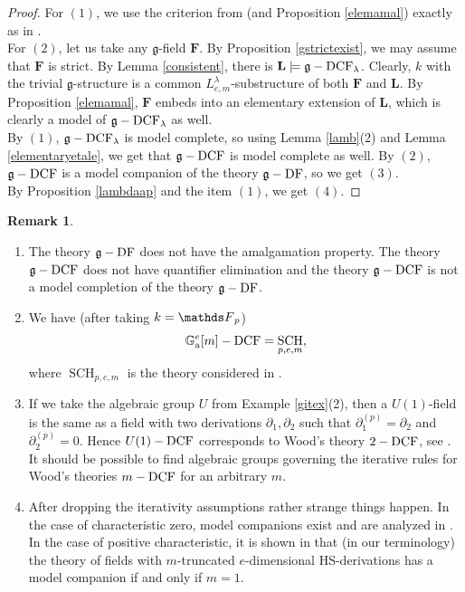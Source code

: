 \documentclass[10pt]{amsart}
\DeclareMathOperator{\sch}{SCH}\DeclareMathOperator{\strict}{strict}\DeclareMathOperator{\der}{Der}\DeclareMathOperator{\acf}{ACF}
\theoremstyle{definition}
\newtheorem{remark}[theorem]{Remark}
\begin{document}
\begin{proof}
For $(1)$, we use the criterion from \cite[Theorem 13.1]{sacks} (and Proposition \ref{elemamal}) exactly as in \cite[3.1]{Zieg2}.
\\
For $(2)$, let us take any $\mathfrak{g}$-field $\mathbf{F}$. By Proposition \ref{gstrictexist}, we may assume that $\mathbf{F}$ is strict. By Lemma \ref{consistent}, there is $\mathbf{L}\models \mathfrak{g}-\operatorname{DCF}_{\lambda}$. Clearly, $k$ with the trivial $\mathfrak{g}$-structure is a common $L^{\lambda}_{e,m}$-substructure of both $\mathbf{F}$ and $\mathbf{L}$. By Proposition \ref{elemamal}, $\mathbf{F}$ embeds into an elementary extension of $\mathbf{L}$, which is clearly a model of  $\mathfrak{g}-\operatorname{DCF}_{\lambda}$ as well.
\\
By $(1)$, $\mathfrak{g}-\operatorname{DCF}_{\lambda}$ is model complete, so using Lemma \ref{lamb}(2) and Lemma \ref{elementaryetale}, we get that $\mathfrak{g}-\operatorname{DCF}$ is model complete as well. By $(2)$, $\mathfrak{g}-\operatorname{DCF}$ is a model companion of the theory $\mathfrak{g}-\operatorname{DF}$, so we get $(3)$.
\\
By Proposition \ref{lambdaap} and the item $(1)$, we get $(4)$.
\end{proof}
\begin{remark}
\begin{enumerate}
\item The theory $\mathfrak{g}-\operatorname{DF}$ does not have the amalgamation property. The theory $\mathfrak{g}-\operatorname{DCF}$ does not have quantifier elimination and the theory $\mathfrak{g}-\operatorname{DCF}$ is not a model completion of the theory $\mathfrak{g}-\operatorname{DF}$.

\item We have (after taking $k=\Ff_p$)
$$\ga^e[m]-\dcf =\sch_{p,e,m},$$
where $\sch_{p,e,m}$ is the theory considered in \cite{K3}.

\item If we take the algebraic group $U$ from Example \ref{gitex}(2), then a $U(1)$-field is the same as a field with two derivations $\partial_1,\partial_2$ such that $\partial_1^{(p)}=\partial_2$ and $\partial_2^{(p)}=0$. Hence $U(1)-\operatorname{DCF}$ corresponds to Wood's theory $2-\operatorname{DCF}$, see \cite{Wo2}. It should be possible to find algebraic groups governing the iterative rules for Wood's theories $m-\operatorname{DCF}$ for an arbitrary $m$.

\item After dropping the iterativity assumptions rather strange things happen. In the case of characteristic zero, model companions exist and are analyzed in \cite{MS2}. In the case of positive characteristic, it is shown in \cite[Prop 7.2]{MS2} that (in our terminology) the theory of fields with $m$-truncated $e$-dimensional HS-derivations has a model companion if and only if $m=1$.

\end{enumerate}
\end{remark}
\end{document}
